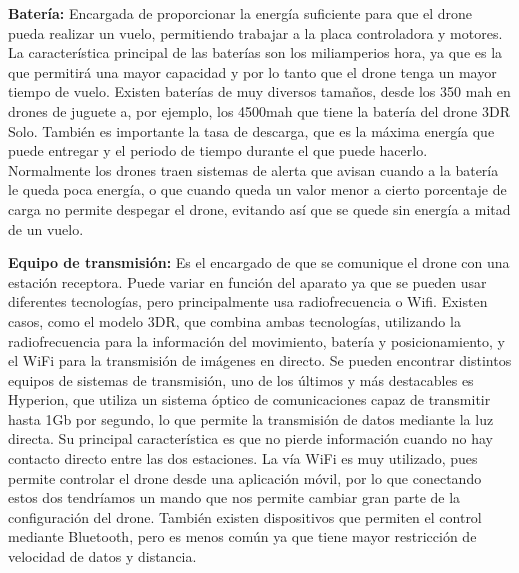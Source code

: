 \hspace{1 cm}\textbf{Bater\'ia:} Encargada de proporcionar la energ\'ia suficiente para que el drone pueda realizar un vuelo, permitiendo trabajar a la placa controladora y motores. La caracter\'istica principal de las bater\'ias son los miliamperios hora, ya que es la que permitir\'a una mayor capacidad y por lo tanto que el drone tenga un mayor tiempo de vuelo. Existen bater\'ias de muy diversos tamaños, desde los 350 mah en drones de juguete a, por ejemplo, los 4500mah que tiene la bater\'ia del drone 3DR Solo. Tambi\'en es importante la tasa de descarga, que es la m\'axima energ\'ia que puede entregar y el periodo de tiempo durante el que puede hacerlo. Normalmente los drones traen sistemas de alerta que avisan cuando a la bater\'ia le queda poca energ\'ia, o que cuando queda un valor menor a cierto porcentaje de carga no permite despegar el drone, evitando as\'i que se quede sin energ\'ia a mitad de un vuelo.


\hspace{1 cm}\textbf{Equipo de transmisi\'on:} Es el encargado de que se comunique el drone con una estaci\'on receptora. Puede variar en funci\'on del aparato ya que se pueden usar diferentes tecnolog\'ias, pero principalmente usa radiofrecuencia o Wifi. Existen casos, como el modelo 3DR, que combina ambas tecnolog\'ias, utilizando la radiofrecuencia para la informaci\'on del movimiento, bater\'ia y posicionamiento, y el WiFi para la transmisi\'on de im\'agenes en directo. Se pueden encontrar distintos equipos de sistemas de transmisi\'on, uno de los \'ultimos y m\'as destacables es Hyperion, que utiliza un sistema \'optico de comunicaciones capaz de transmitir hasta 1Gb por segundo, lo que permite la transmisi\'on de datos mediante la luz directa. Su principal caracter\'istica es que no pierde informaci\'on cuando no hay contacto directo entre las dos estaciones. La v\'ia WiFi es muy utilizado, pues permite controlar el drone desde una aplicaci\'on m\'ovil, por lo que conectando estos dos tendr\'iamos un mando que nos permite cambiar gran parte de la configuraci\'on del drone. Tambi\'en existen dispositivos que permiten el control mediante Bluetooth, pero es menos com\'un ya que tiene mayor restricci\'on de velocidad de datos y distancia. 


